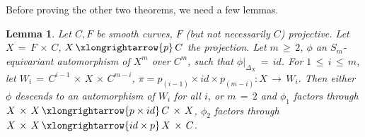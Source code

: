 \documentclass[12pt,reqno]{amsart}
\newtheorem{lemma}{Lemma}[section]
\theoremstyle{definition}
\numberwithin{equation}{section}
\begin{document}
Before proving the other two theorems, we need a few lemmas.

\begin{lemma}\label{open}
Let $C, F$ be smooth curves, $F$ (but not necessarily $C$) projective. Let $X\,=\, F\,\times\, C$, $X\,\xlongrightarrow{p}\,C$ the projection. Let $m\,\geq\, 2$, $\phi$ an $S_m$-equivariant automorphism of $X^{m}$ over $C^{m}$, such that $\phi{|_{\Delta_{X}}}\,=\, id$. For $1\,\leq\,i\,\leq\, m$, let $W_{i}\,=\, C^{i-1}\,\times\, X\,\times\, C^{m-i}$, $\pi=p_{(i-1)}\times id \times p_{(m-i)}: X\,\to \, W_{i}$. Then either $\phi$ descends to an automorphism of $W_{i}$ for all $i$, or $m\,=\,2$ and $\phi_{1}$ factors through $X\,\times\, X\,\xlongrightarrow{p\times id}\, C\,\times\,X$, $\phi_{2}$ factors through $X\,\times\, X\,\xlongrightarrow{id\times p}\, X\,\times\, C$.
\end{lemma}
\end{document}
